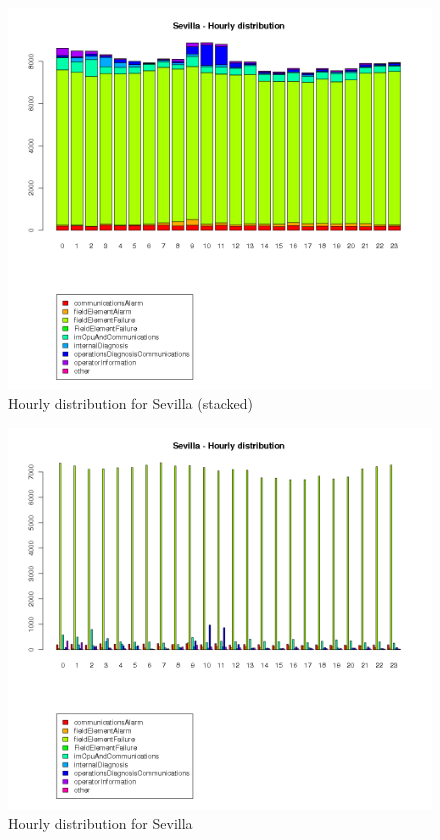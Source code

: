 \documentclass[a4paper,10pt]{book}
\begin{document}
\begin{figure}[h!]
 \centering
 \includegraphics[height=0.4\textheight]{./img/sevilla_timeline.png}
 \caption{Hourly distribution for Sevilla (stacked)}
\end{figure}
\begin{figure}[h!]
 \centering
 \includegraphics[height=0.4\textheight]{./img/sevilla_timeline_b.png}
 \caption{Hourly distribution for Sevilla}
\end{figure}
\end{document}
